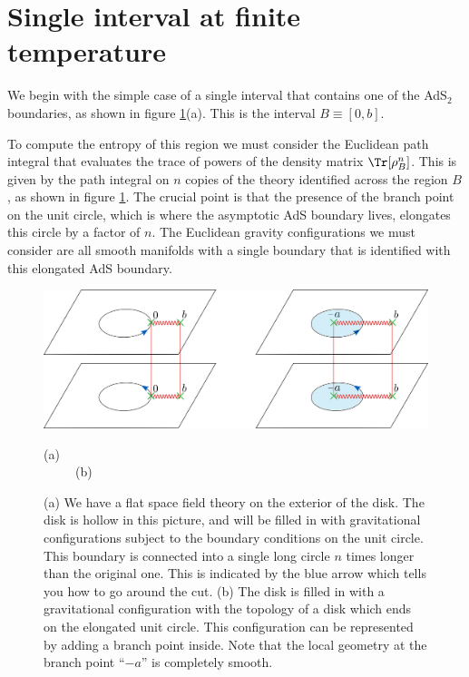 \newcommand{\by}{\bar{y}}
\newcommand{\bw}{\bar{w}}
\newcommand{\bx}{\bar{x}}
\newcommand{\bu}{\bar{u}}
\newcommand{\bv}{\bar{v}}
\renewcommand{\ba}{\bar{a}}
\newcommand{\E}{{\cal E}}
\newcommand{\Hilbert}{{\rm H}}


\section{Single interval at finite temperature}


 We begin with the simple case of a single interval that contains one of the AdS$_2$ boundaries, as shown in figure 
 \ref{SingleIntervalSheets}(a). This is the interval $B \equiv  { [ 0, b ]}$.



To compute the entropy of this region we must consider the Euclidean path integral that evaluates the trace of powers of the density matrix $\Tr[\rho_B^n]$. This is given by the path integral on $n$ copies of the theory identified across the region $B$, as shown in figure \ref{SingleIntervalSheets}. The crucial point is that the presence of the branch point on the unit circle, which is where the asymptotic AdS boundary lives, elongates this circle by a factor of $n$. The Euclidean gravity configurations we must consider are all smooth manifolds with a single boundary that is identified with this elongated AdS boundary.

\begin{figure}
\begin{center}
\includegraphics[scale=0.5]{figures/SingleIntervalSheets}

(a) ~~~~~~~~~~~~~~~~~~~~~~~~~~~~~~~~~~~~~~~~~~~~~~~~~~~~ ~~~~~(b)
\end{center}
\caption{\small  
(a) We have a flat space field theory on the exterior of the disk. The disk is hollow in this picture, and will be filled in with gravitational configurations subject to the boundary conditions on the unit circle. 
 This boundary is connected into a single long circle $n$ times longer than the original one. This is indicated by the blue arrow which tells you how to go around the cut. (b) The disk is filled in with a gravitational configuration with the topology of a disk which ends on the elongated unit circle.  This configuration can be represented by adding a branch point inside. Note that the local geometry at the branch point ``$-a$'' is completely smooth.  
\label{SingleIntervalSheets}}
\end{figure}

